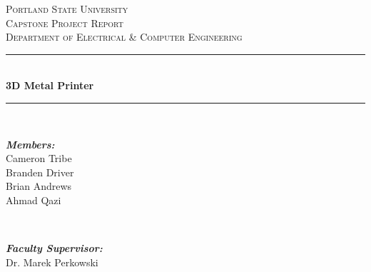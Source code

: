 \documentclass[12pt]{article}
\begin{document}
\begin{titlepage}

\newcommand{\HRule}{\rule{\linewidth}{0.5mm}} %

\center %
 \bigskip 
 \bigskip

\textsc{\LARGE Portland State University}\\[1.5cm] %
\textsc{\Large Capstone Project Report}\\[0.5cm] %
\textsc{\large Department of Electrical \& Computer Engineering}\\[0.5cm] %

\bigskip
\bigskip
\bigskip
\HRule \\[0.4cm]
{ \huge \bfseries 3D Metal Printer}\\[0.4cm] %
\HRule \\[1.5cm]
 

\begin{minipage}{0.4\textwidth}
\begin{flushleft} \large
\emph{\textbf{Members:}}\\
Cameron Tribe\\ %
Branden Driver\\ %
Brian Andrews\\ %
Ahmad Qazi %
\end{flushleft}
\end{minipage}
~
\begin{minipage}{0.4\textwidth}
\begin{flushright} \large
\emph{\textbf{Faculty Supervisor:}} \\
Dr. Marek Perkowski \\ %


\end{flushright}
\end{minipage}
\end{titlepage}
\end{document}
